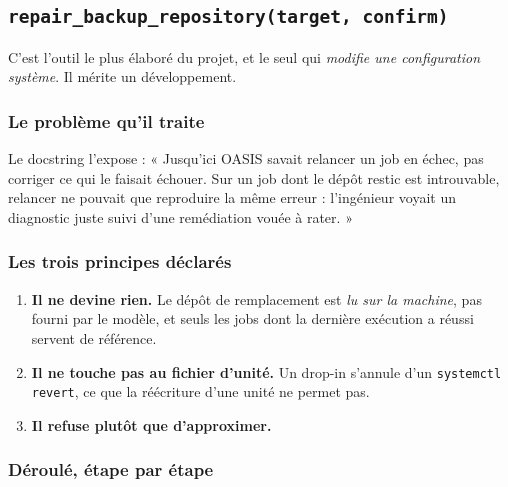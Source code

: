 \documentclass[11pt,a4paper]{report}
\newcommand{\fn}[1]{\texttt{\small\textcolor{oasisviolet}{#1}}}
\begin{document}
\subsection{\fn{repair\_backup\_repository(target, confirm)}}

C'est l'outil le plus élaboré du projet, et le seul qui \emph{modifie une
configuration système}. Il mérite un développement.

\subsubsection*{Le problème qu'il traite}
Le docstring l'expose : « Jusqu'ici OASIS savait relancer un job en échec, pas
corriger ce qui le faisait échouer. Sur un job dont le dépôt restic est
introuvable, relancer ne pouvait que reproduire la même erreur : l'ingénieur
voyait un diagnostic juste suivi d'une remédiation vouée à rater. »

\subsubsection*{Les trois principes déclarés}
\begin{enumerate}
  \item \textbf{Il ne devine rien.} Le dépôt de remplacement est \emph{lu sur la
  machine}, pas fourni par le modèle, et seuls les jobs dont la dernière
  exécution a réussi servent de référence.
  \item \textbf{Il ne touche pas au fichier d'unité.} Un drop-in s'annule d'un
  \texttt{systemctl revert}, ce que la réécriture d'une unité ne permet pas.
  \item \textbf{Il refuse plutôt que d'approximer.}
\end{enumerate}

\subsubsection*{Déroulé, étape par étape}
\end{document}
